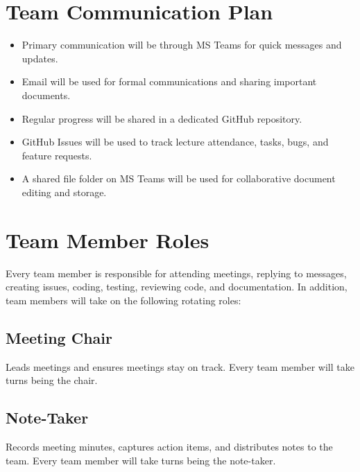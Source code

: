 \documentclass{article}
\begin{document}
\section{Team Communication Plan}

\begin{itemize}
  \item Primary communication will be through MS Teams for quick messages and updates.
  \item Email will be used for formal communications and sharing important documents.
  \item Regular progress will be shared in a dedicated GitHub repository.
  \item GitHub Issues will be used to track lecture attendance, tasks, bugs, and feature requests.
  \item A shared file folder on MS Teams will be used for collaborative document editing and storage.
\end{itemize}

\section{Team Member Roles}


Every team member is responsible for attending meetings, replying to messages, creating issues, coding, testing,
reviewing code, and documentation.  In addition, team members will take on
the following rotating roles:

\subsection*{Meeting Chair}
Leads meetings and ensures meetings stay on track.
Every team member will take turns being the chair.

\subsection*{Note-Taker}
Records meeting minutes, captures action items, and distributes notes to the team.
Every team member will take turns being the note-taker.
\end{document}
